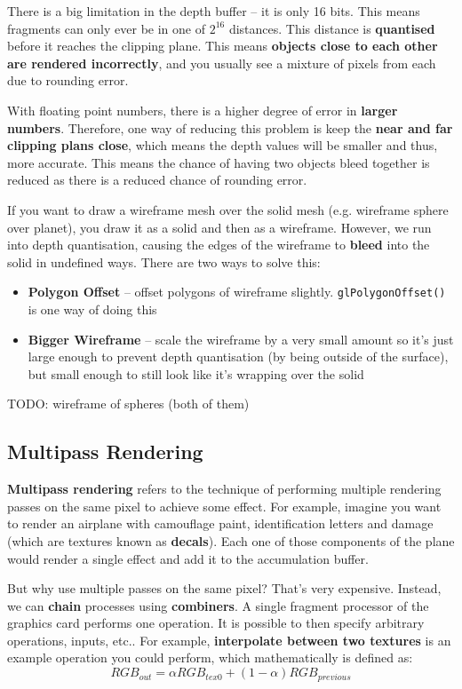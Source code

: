 \documentclass{article}
\begin{document}
There is a big limitation in the depth buffer -- it is only 16 bits. This means fragments can only ever be in one of $2^{16}$ distances. This distance is \textbf{quantised} before it reaches the clipping plane. This means \textbf{objects close to each other are rendered incorrectly}, and you usually see a mixture of pixels from each due to rounding error.

With floating point numbers, there is a higher degree of error in \textbf{larger numbers}.  Therefore, one way of reducing this problem is keep the \textbf{near and far clipping plans close}, which means the depth values will be smaller and thus, more accurate. This means the chance of having two objects bleed together is reduced as there is a reduced chance of rounding error.

If you want to draw a wireframe mesh over the solid mesh (e.g. wireframe sphere over planet), you draw it as a solid and then as a wireframe. However, we run into depth quantisation, causing the edges of the wireframe to \textbf{bleed} into the solid in undefined ways. There are two ways to solve this:
\begin{itemize}
	\item \textbf{Polygon Offset} -- offset polygons of wireframe slightly. \texttt{glPolygonOffset()} is one way of doing this
	\item \textbf{Bigger Wireframe} -- scale the wireframe by a very small amount so it's just large enough to prevent depth quantisation (by being outside of the surface), but small enough to still look like it's wrapping over the solid
\end{itemize}

TODO: wireframe of spheres (both of them)

\subsection{Multipass Rendering}

\textbf{Multipass rendering} refers to the technique of performing multiple rendering passes on the same pixel to achieve some effect. For example, imagine you want to render an airplane with camouflage paint, identification letters and damage (which are textures known as \textbf{decals}). Each one of those components of the plane would render a single effect and add it to the accumulation buffer. 

But why use multiple passes on the same pixel? That's very expensive. Instead, we can \textbf{chain} processes using \textbf{combiners}. A single fragment processor of the graphics card performs one operation. It is possible to then specify arbitrary operations, inputs, etc.. For example, \textbf{interpolate between two textures} is an example operation you could perform, which mathematically is defined as:
\begin{equation}
	RGB_{out} = \alpha RGB_{tex0} + (1- \alpha) RGB_{previous}
\end{equation}
\end{document}
